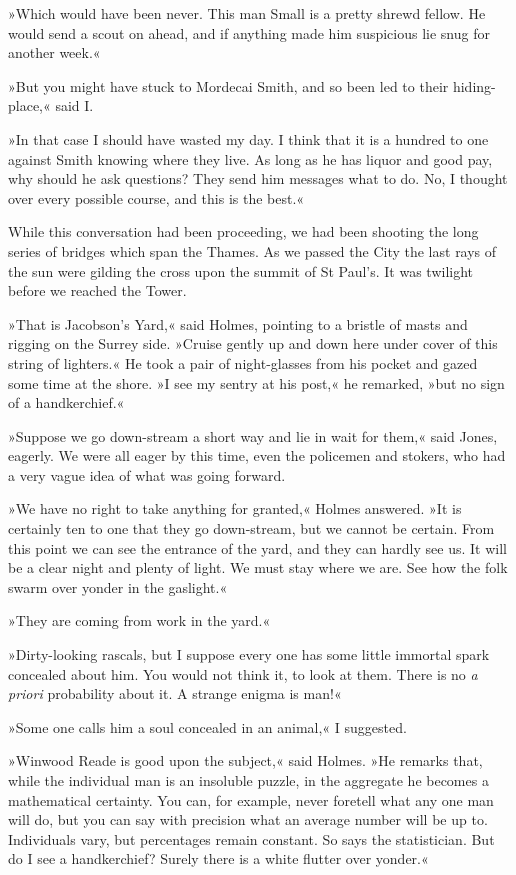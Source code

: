 »Which would have been never. This man Small is a pretty shrewd fellow. He would send a scout on ahead, and if anything made him suspicious lie snug for another week.«

»But you might have stuck to Mordecai Smith, and so been led to their hiding-place,« said I.

»In that case I should have wasted my day. I think that it is a hundred to one against Smith knowing where they live. As long as he has liquor and good pay, why should he ask questions? They send him messages what to do. No, I thought over every possible course, and this is the best.«

While this conversation had been proceeding, we had been shooting the long series of bridges which span the Thames. As we passed the City the last rays of the sun were gilding the cross upon the summit of St Paul's. It was twilight before we reached the Tower.

»That is Jacobson's Yard,« said Holmes, pointing to a bristle of masts and rigging on the Surrey side. »Cruise gently up and down here under cover of this string of lighters.« He took a pair of night-glasses from his pocket and gazed some time at the shore. »I see my sentry at his post,« he remarked, »but no sign of a handkerchief.«

»Suppose we go down-stream a short way and lie in wait for them,« said Jones, eagerly. We were all eager by this time, even the policemen and stokers, who had a very vague idea of what was going forward.

»We have no right to take anything for granted,« Holmes answered. »It is certainly ten to one that they go down-stream, but we cannot be certain. From this point we can see the entrance of the yard, and they can hardly see us. It will be a clear night and plenty of light. We must stay where we are. See how the folk swarm over yonder in the gaslight.«

»They are coming from work in the yard.«

»Dirty-looking rascals, but I suppose every one has some little immortal spark concealed about him. You would not think it, to look at them. There is no \textit{a priori} probability about it. A strange enigma is man!«

»Some one calls him a soul concealed in an animal,« I suggested.

»Winwood Reade is good upon the subject,« said Holmes. »He remarks that, while the individual man is an insoluble puzzle, in the aggregate he becomes a mathematical certainty. You can, for example, never foretell what any one man will do, but you can say with precision what an average number will be up to. Individuals vary, but percentages remain constant. So says the statistician. But do I see a handkerchief? Surely there is a white flutter over yonder.«


